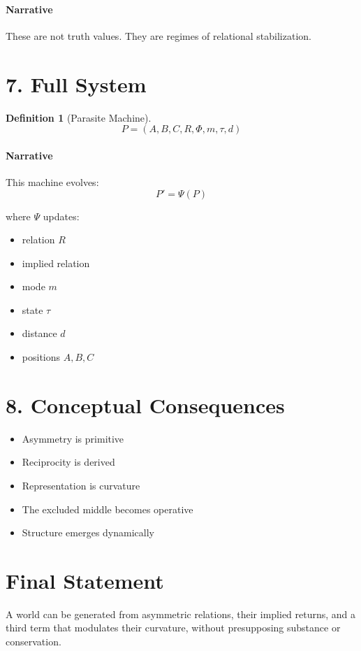 \documentclass[11pt]{article}
\newtheorem{definition}{Definition}
\begin{document}
\paragraph{Narrative}
These are not truth values.
They are regimes of relational stabilization.

\section{7. Full System}
\begin{definition}[Parasite Machine]
\[
P = (A,B,C,R,\Phi,m,\tau,d)
\]
\end{definition}

\paragraph{Narrative}
This machine evolves:
\[
P' = \Psi(P)
\]

where $\Psi$ updates:
\begin{itemize}
\item relation $R$
\item implied relation
\item mode $m$
\item state $\tau$
\item distance $d$
\item positions $A,B,C$
\end{itemize}

\section{8. Conceptual Consequences}
\begin{itemize}
\item Asymmetry is primitive
\item Reciprocity is derived
\item Representation is curvature
\item The excluded middle becomes operative
\item Structure emerges dynamically
\end{itemize}

\section*{Final Statement}
A world can be generated from asymmetric relations, their implied returns, and a third term that modulates their curvature, without presupposing substance or conservation.
\end{document}
